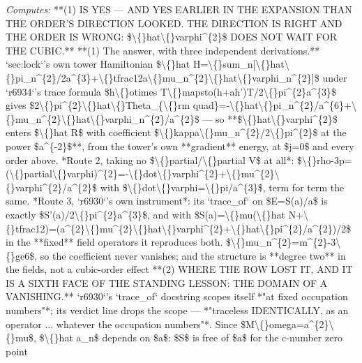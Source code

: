 \begin{description}
\emph{Computes:} **(1) IS YES --- AND YES EARLIER IN THE EXPANSION THAN THE ORDER'S DIRECTION LOOKED. THE DIRECTION IS RIGHT AND THE ORDER IS WRONG: \$\textbackslash\{\}hat\textbackslash\{\}varphi\textasciicircum{}\{2\}\$ DOES NOT WAIT FOR THE CUBIC.**  **(1) The answer, with three independent derivations.** `sec:lock`'s own tower Hamiltonian \$\textbackslash\{\}hat H=\textbackslash\{\}sum\_n[\textbackslash\{\}hat\textbackslash\{\}pi\_n\textasciicircum{}\{2\}/2a\textasciicircum{}\{3\}+\textbackslash\{\}tfrac12a\textbackslash\{\}mu\_n\textasciicircum{}\{2\}\textbackslash\{\}hat\textbackslash\{\}varphi\_n\textasciicircum{}\{2\}]\$ under `r6934`'s trace formula \$h\textbackslash\{\}otimes T\textbackslash\{\}mapsto(h+ah')T/2\textbackslash\{\}pi\textasciicircum{}\{2\}a\textasciicircum{}\{3\}\$ gives \$2\textbackslash\{\}pi\textasciicircum{}\{2\}\textbackslash\{\}hat\textbackslash\{\}Theta\_\{\textbackslash\{\}rm quad\}=-\textbackslash\{\}hat\textbackslash\{\}pi\_n\textasciicircum{}\{2\}/a\textasciicircum{}\{6\}+\textbackslash\{\}mu\_n\textasciicircum{}\{2\}\textbackslash\{\}hat\textbackslash\{\}varphi\_n\textasciicircum{}\{2\}/a\textasciicircum{}\{2\}\$ --- so **\$\textbackslash\{\}hat\textbackslash\{\}varphi\textasciicircum{}\{2\}\$ enters \$\textbackslash\{\}hat R\$ with coefficient \$\textbackslash\{\}kappa\textbackslash\{\}mu\_n\textasciicircum{}\{2\}/2\textbackslash\{\}pi\textasciicircum{}\{2\}\$ at the power \$a\textasciicircum{}\{-2\}\$**, from the tower's own **gradient** energy, at \$j=0\$ and every order above. *Route 2, taking no \$\textbackslash\{\}partial/\textbackslash\{\}partial V\$ at all*: \$\textbackslash\{\}rho-3p=(\textbackslash\{\}partial\textbackslash\{\}varphi)\textasciicircum{}\{2\}=-\textbackslash\{\}dot\textbackslash\{\}varphi\textasciicircum{}\{2\}+\textbackslash\{\}mu\textasciicircum{}\{2\}\textbackslash\{\}varphi\textasciicircum{}\{2\}/a\textasciicircum{}\{2\}\$ with \$\textbackslash\{\}dot\textbackslash\{\}varphi=\textbackslash\{\}pi/a\textasciicircum{}\{3\}\$, term for term the same. *Route 3, `r6930`'s own instrument*: its `trace\_of` on \$E=S(a)/a\$ is exactly \$S'(a)/2\textbackslash\{\}pi\textasciicircum{}\{2\}a\textasciicircum{}\{3\}\$, and with \$S(a)=\textbackslash\{\}mu(\textbackslash\{\}hat N+\textbackslash\{\}tfrac12)=(a\textasciicircum{}\{2\}\textbackslash\{\}mu\textasciicircum{}\{2\}\textbackslash\{\}hat\textbackslash\{\}varphi\textasciicircum{}\{2\}+\textbackslash\{\}hat\textbackslash\{\}pi\textasciicircum{}\{2\}/a\textasciicircum{}\{2\})/2\$ in the **fixed** field operators it reproduces both. \$\textbackslash\{\}mu\_n\textasciicircum{}\{2\}=m\textasciicircum{}\{2\}-3\textbackslash\{\}ge6\$, so the coefficient never vanishes; and the structure is **degree two** in the fields, not a cubic-order effect  **(2) WHERE THE ROW LOST IT, AND IT IS A SIXTH FACE OF THE STANDING LESSON: THE DOMAIN OF A VANISHING.** `r6930`'s `trace\_of` docstring scopes itself *"at fixed occupation numbers"*; its verdict line drops the scope --- *"traceless IDENTICALLY, as an operator ... whatever the occupation numbers"*. Since \$M\textbackslash\{\}omega=a\textasciicircum{}\{2\}\textbackslash\{\}mu\$, \$\textbackslash\{\}hat a\_n\$ depends on \$a\$: \$S\$ is free of \$a\$ for the c-number zero point 
\end{description}
